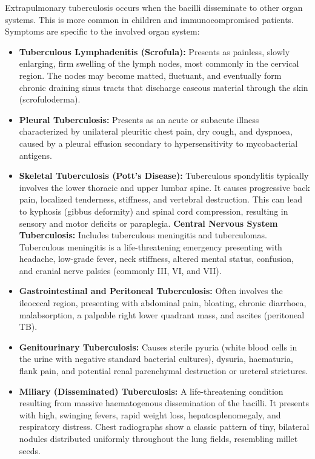 Extrapulmonary tuberculosis occurs when the bacilli disseminate to other organ systems. This is more common in children and immunocompromised patients. Symptoms are specific to the involved organ system:
\begin{itemize}
    \item \textbf{Tuberculous Lymphadenitis (Scrofula):} Presents as painless, slowly enlarging, firm swelling of the lymph nodes, most commonly in the cervical region. The nodes may become matted, fluctuant, and eventually form chronic draining sinus tracts that discharge caseous material through the skin (scrofuloderma).
    \item \textbf{Pleural Tuberculosis:} Presents as an acute or subacute illness characterized by unilateral pleuritic chest pain, dry cough, and dyspnoea, caused by a pleural effusion secondary to hypersensitivity to mycobacterial antigens.
    \item \textbf{Skeletal Tuberculosis (Pott's Disease):} Tuberculous spondylitis typically involves the lower thoracic and upper lumbar spine. It causes progressive back pain, localized tenderness, stiffness, and vertebral destruction. This can lead to kyphosis (gibbus deformity) and spinal cord compression, resulting in sensory and motor deficits or paraplegia.
    \textbf{Central Nervous System Tuberculosis:} Includes tuberculous meningitis and tuberculomas. Tuberculous meningitis is a life-threatening emergency presenting with headache, low-grade fever, neck stiffness, altered mental status, confusion, and cranial nerve palsies (commonly III, VI, and VII).
    \item \textbf{Gastrointestinal and Peritoneal Tuberculosis:} Often involves the ileocecal region, presenting with abdominal pain, bloating, chronic diarrhoea, malabsorption, a palpable right lower quadrant mass, and ascites (peritoneal TB).
    \item \textbf{Genitourinary Tuberculosis:} Causes sterile pyuria (white blood cells in the urine with negative standard bacterial cultures), dysuria, haematuria, flank pain, and potential renal parenchymal destruction or ureteral strictures.
    \item \textbf{Miliary (Disseminated) Tuberculosis:} A life-threatening condition resulting from massive haematogenous dissemination of the bacilli. It presents with high, swinging fevers, rapid weight loss, hepatosplenomegaly, and respiratory distress. Chest radiographs show a classic pattern of tiny, bilateral nodules distributed uniformly throughout the lung fields, resembling millet seeds.
\end{itemize}


